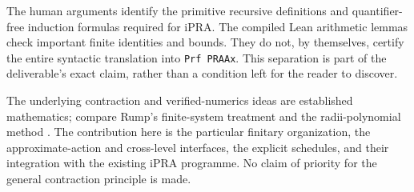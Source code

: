 The human arguments identify the primitive recursive definitions and
quantifier-free induction formulas required for iPRA. The compiled
Lean arithmetic lemmas check important finite identities and bounds.
They do not, by themselves, certify the entire syntactic translation into
\texttt{Prf PRAAx}. This separation is part of the deliverable's exact
claim, rather than a condition left for the reader to discover.

The underlying contraction and verified-numerics ideas are established
mathematics; compare Rump's finite-system treatment and the radii-polynomial
method \cite{rump1994,radii}. The contribution here is the particular
finitary organization, the approximate-action and cross-level interfaces,
the explicit schedules, and their integration with the existing iPRA
programme. No claim of priority for the general contraction principle is
made.
